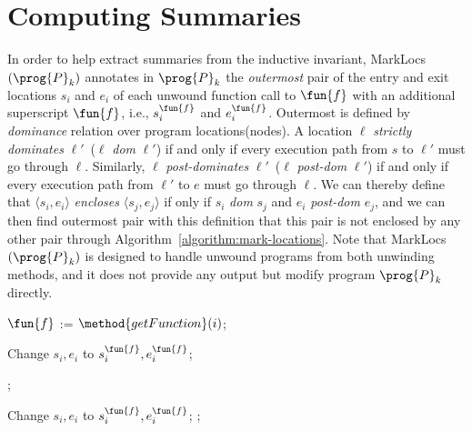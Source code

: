 
\section{Computing Summaries}\label{sec:computing-summary}
In order to help extract summaries from the inductive invariant,
MarkLocs$(\prog{P}_k)$ annotates in $\prog{P}_k$ the \emph{outermost} pair of
the entry and exit locations ${s_i}$ and ${e_i}$ of each unwound function call
to $\fun{f}$ with an additional superscript $\fun{f}$, i.e., $s_i^\fun{f}$ and
$e_i^\fun{f}$.
Outermost is defined by \emph{dominance} relation over program locations(nodes).
A location $\ell$ \emph{strictly dominates} $\ell'$~($\ell$ \emph{dom} $\ell'$)
if and only if every execution path from $s$ to $\ell'$ must go through $\ell$.
Similarly, $\ell$ \emph{post-dominates} $\ell'$~($\ell$ \emph{post-dom} $\ell'$)
if and only if every execution path from $\ell'$ to $e$ must go through $\ell$.
We can thereby define that $\langle s_i, e_i \rangle$ \emph{encloses}
$\langle s_j, e_j \rangle$ if only if $s_i$ \emph{dom} $s_j$ and $e_i$
\emph{post-dom} $e_j$,
and we can then find outermost pair with this definition that this pair is not
enclosed by any other pair through Algorithm~\ref{algorithm:mark-locations}.
Note that MarkLocs$(\prog{P}_k)$ is designed to handle unwound programs from
both unwinding methods,
and it does not provide any output but modify program $\prog{P}_k$ directly.


\begin{algorithm}
\begin{doublespace}
  {
    {
      $\fun{f}$ := $\method{getFunction}(i)$;

      {
        Change $s_i, e_i$ to $s^\fun{f}_i, e^\fun{f}_i$;
      }
    }
    \Return;
  }
  {
    {
      {
        Change $s_i, e_i$ to $s^\fun{f}_i, e^\fun{f}_i$;
      }
    }
    \Return;
  }
\end{doublespace}
  \caption{
  $\textmd{MarkLocs}(\prog{P}_k)$}
  \label{algorithm:mark-locations}
\end{algorithm}

